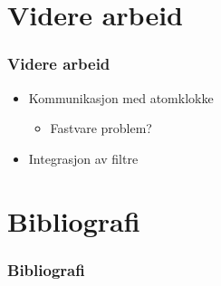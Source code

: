 \documentclass[xcolor=table]{beamer}
\begin{document}
\section{Videre arbeid}
\begin{frame}
    \frametitle{Videre arbeid}
  \begin{itemize}
  \item Kommunikasjon med atomklokke
    \begin{itemize}
      \item Fastvare problem?
    \end{itemize}
  \item Integrasjon av filtre
  \end{itemize}
\end{frame}

\section{Bibliografi}
\begin{frame}[allowframebreaks]%
  \frametitle{Bibliografi}
  \printbibliography[heading=bibintoc]
\end{frame}
\end{document}
